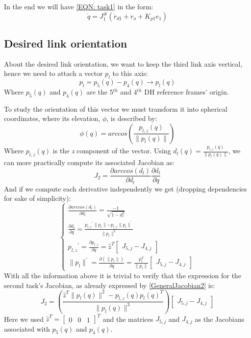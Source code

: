 \documentclass[12pt, a4paper]{article}
\newcommand{\diff}[2]{\frac{\partial{#1}}{\partial{#2}}}
\newcommand{\norm}[1]{\parallel{#1}\parallel}
\begin{document}
In the end we will have \eqref{EQN: task1} in the form: 
\[
\dot{q} = J_1^{\#}(\dot{r}_{d1}+\dot{r}_o + K_{p1}e_1)
\]
\subsection[Task 2]{Desired link orientation}
About the desired link orientation, we want to keep the third link axis vertical, hence we need to attach a vector $p_l$ to this axis:
\[
p_l = p_5(q) - p_4(q) \rightarrow p_l(q)
\]
Where $p_5(q)$ and $p_4(q)$ are the 5$^{th}$ and 4$^{th}$ DH reference frames' origin.

To study the orientation of this vector we must transform it into spherical coordinates, where its elevation, $\phi$, is described by:
\[
\phi(q) = \mathit{arccos}(\frac{p_{l,z}(q)}{\norm{p_l(q)}})
\]
Where $p_{l,z}(q)$ is the \textit{z} component of the vector. Using $d_l(q) = \frac{p_{l,z}(q)}{\norm{p_l(q)}}$, we can more practically compute its associated Jacobian as:
\begin{equation}
\label{GeneralJacobian2}
J_2 = \diff{\mathit{arccos}(d_l)}{d_l}\diff{d_l}{q}
\end{equation}
And if we compute each derivative independently we get (dropping dependencies for sake of simplicity):
\[
\begin{cases}
\diff{\mathit{arccos}(d_l)}{d_l} = \frac{-1}{\sqrt{1-d_l^2}}\\
\diff{d_l}{q} = \frac{{p_{l,z}}^{'}\norm{p_l} - p_{l,z}\norm{p_l}^{'}}{\norm{p_l}^2}\\
{p_{l,z}}^{'} = \diff{p_{l,z}}{q} = \hat{z}^T\begin{bmatrix}
J_{5,j} - J_{4,j}
\end{bmatrix} \\
\norm{p_l}^{'} = \diff{(\norm{p_l})}{q}= \frac{p_l^T}{\norm{p_l}}\begin{bmatrix}
J_{5,j}-J_{4,j}
\end{bmatrix}
\end{cases}
\]
With all the information above it is trivial to verify that the expression for the second task's Jacobian, as already expressed by \eqref{GeneralJacobian2} is:
\begin{equation}
J_2 = (\frac{\hat{z}^T\norm{p_l(q)}^2 - p_{l,z}(q)p_l(q)^T}{\norm{p_l(q)}^3})\begin{bmatrix}
J_{5,j} - J_{4,j}
\end{bmatrix}
\end{equation}
Here we used $\hat{z}^T = \begin{bmatrix} 0&0&1\end{bmatrix}^T$ and the matrices $J_{5,j}$ and $J_{4,j}$ as the Jacobians associated with $p_5(q)$ and $p_4(q)$.
\end{document}
